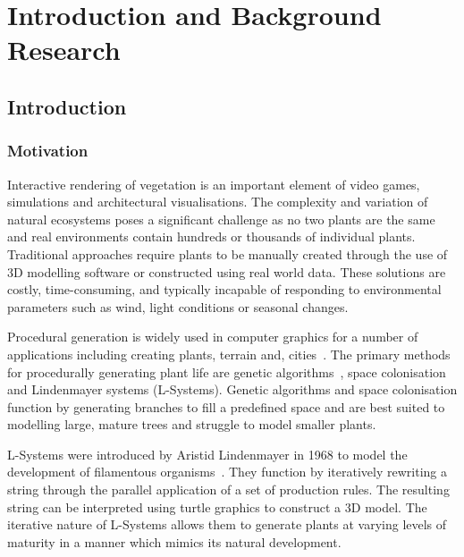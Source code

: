 \chapter{Introduction and Background Research}
\label{chapter1}

\section{Introduction}

\subsection{Motivation}

Interactive rendering of vegetation is an important element of video games, simulations and architectural
visualisations. The complexity and variation of natural ecosystems poses a significant challenge as no two
plants are the same and real environments contain hundreds or thousands of individual plants. Traditional
approaches require plants to be manually created through the use of 3D modelling software or constructed
using real world data. These solutions are costly, time-consuming, and typically incapable of responding to
environmental parameters such as wind, light conditions or seasonal changes.

\medskip
Procedural generation is widely used in computer graphics for a number of applications including creating
plants, terrain and, cities~\cite{freiknechtSurveyProceduralGeneration2017,zhangSurveyProceduralContent2022}.
The primary methods for procedurally generating plant life are genetic
algorithms~\cite{haubenwallnerShapeGeneticsUsingGenetic2017}, space
colonisation~\cite{runionsModelingTreesSpace,ratulApplicabilitySpaceColonization2019} and Lindenmayer systems
(L-Systems). Genetic algorithms and space colonisation function by generating branches to fill a predefined
space and are best suited to modelling large, mature trees and struggle to model smaller plants.

\medskip
L-Systems were introduced by Aristid Lindenmayer in 1968 to model the development of filamentous
organisms~\cite{lindenmayerMathematicalModelsCellular1968}. They function by iteratively rewriting a string
through the parallel application of a set of production rules. The resulting string can be interpreted using
turtle graphics to construct a 3D model. The iterative nature of L-Systems allows them to generate plants at
varying levels of maturity in a manner which mimics its natural development.

